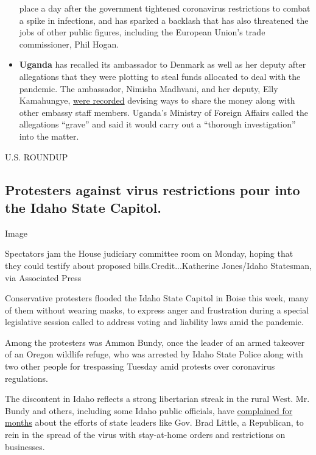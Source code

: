 \begin{itemize}
  place a day after the government tightened coronavirus restrictions to
  combat a spike in infections, and has sparked a backlash that has also
  threatened the jobs of other public figures, including the European
  Union's trade commissioner, Phil Hogan.
\item
  \textbf{Uganda} has recalled its ambassador to Denmark as well as her
  deputy after allegations that they were plotting to steal funds
  allocated to deal with the pandemic. The ambassador, Nimisha Madhvani,
  and her deputy, Elly Kamahungye,
  \href{https://twitter.com/kaysafi1/status/1297938862711484416}{were
  recorded} devising ways to share the money along with other embassy
  staff members. Uganda's Ministry of Foreign Affairs called the
  allegations ``grave'' and said it would carry out a ``thorough
  investigation'' into the matter.
\end{itemize}

U.S. ROUNDUP

\hypertarget{protesters-against-virus-restrictions-pour-into-the-idaho-state-capitol}{%
\subsection{Protesters against virus restrictions pour into the Idaho
State
Capitol.}\label{protesters-against-virus-restrictions-pour-into-the-idaho-state-capitol}}

Image

Spectators jam the House judiciary committee room on Monday, hoping that
they could testify about proposed bills.Credit...Katherine Jones/Idaho
Statesman, via Associated Press

Conservative protesters flooded the Idaho State Capitol in Boise this
week, many of them without wearing masks, to express anger and
frustration during a special legislative session called to address
voting and liability laws amid the pandemic.

Among the protesters was Ammon Bundy, once the leader of an armed
takeover of an Oregon wildlife refuge, who was arrested by Idaho State
Police along with two other people for trespassing Tuesday amid protests
over coronavirus regulations.

The discontent in Idaho reflects a strong libertarian streak in the
rural West. Mr. Bundy and others, including some Idaho public officials,
have
\href{https://www.nytimes3xbfgragh.onion/2020/04/07/us/coronavirus-idaho-bundy-patriot.html}{complained
for months} about the efforts of state leaders like Gov. Brad Little, a
Republican, to rein in the spread of the virus with stay-at-home orders
and restrictions on businesses.

